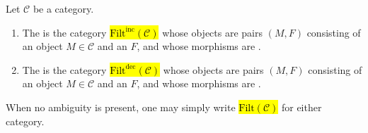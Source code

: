 \begin{definition} \label{definition:category_of_filtered_objects_in_a_category}
Let $\mathcal{C}$ be a category. 
\begin{enumerate}
    \item The  is the category \hl{$\text{Filt}^{\text{inc}}(\mathcal{C})$} whose objects are pairs $(M, F)$ consisting of an object $M \in \mathcal{C}$ and an  $F$, and whose morphisms are .

    \item The  is the category \hl{$\text{Filt}^{\text{dec}}(\mathcal{C})$} whose objects are pairs $(M, F)$ consisting of an object $M \in \mathcal{C}$ and an  $F$, and whose morphisms are .
\end{enumerate}
When no ambiguity is present, one may simply write \hl{$\text{Filt}(\mathcal{C})$} for either category.
\end{definition}